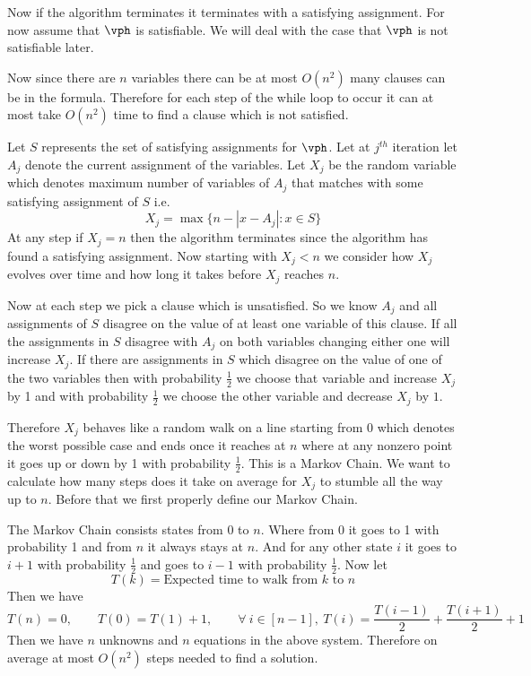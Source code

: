 Now if the algorithm terminates it terminates with a satisfying assignment. For now assume that $\vph$ is satisfiable. We will deal with the case that $\vph$ is not satisfiable later. 

Now since there are $n$ variables there can be at most $O(n^2)$ many clauses can be in the formula. Therefore for each step of the while loop to occur it can at most take $O(n^2)$ time to find a clause which is not satisfied.

Let $S$ represents the set of satisfying assignments for $\vph$. Let at $j^{th}$ iteration let $A_j$ denote the current assignment of the variables. Let $X_j$ be the random variable which denotes maximum number of variables of $A_j$ that matches with some satisfying assignment of $S$ i.e. $$X_j=\max\{n-|x-A_j|\colon x\in S\}$$At any step if $X_j=n$ then the algorithm terminates since the algorithm has found a satisfying assignment. Now starting with $X_j<n$ we consider how $X_j$ evolves over time and how long it takes before $X_j$ reaches $n$.

Now at each step we pick a clause which is unsatisfied. So we know $A_j$ and all assignments of $S$ disagree on the value of at least one variable of this clause. If all the assignments in $S$ disagree with $A_j$ on both variables changing either one will increase $X_j$. If there are assignments in $S$ which disagree on the value of one of the two variables then with probability $\frac12$ we choose that variable and increase $X_j$ by 1 and with probability $\frac12$ we choose the other variable and decrease $X_j$ by $1$.

Therefore $X_j$ behaves like a random walk on a line starting from $0$ which denotes the worst possible case and ends once it reaches at $n$ where at any nonzero point it goes up or down by 1 with probability $\frac12$. This is a Markov Chain. We want to calculate how many steps does it take on average for $X_j$ to stumble all the way up to $n$. Before that we first properly define our Markov Chain.

The Markov Chain consists states from $0 $ to $n$. Where from 0 it goes to 1 with probability 1 and from $n$ it always stays at $n$. And for any other state $i$ it goes to $i+1$ with probability $\frac12$ and goes to $i-1$ with probability $\frac12$. Now let $$T(k)=\text{Expected time to walk from $k$ to $n$}$$ Then we have $$T(n)=0,\qquad T(0)=T(1)+1, \qquad\forall\ i\in [n-1],\ T(i)=\frac{T(i-1)}{2}+\frac{T(i+1)}2+1$$Then we have $n$ unknowns and $n$ equations in the above system. Therefore on average at most $O(n^2)$ steps needed to find a solution.

